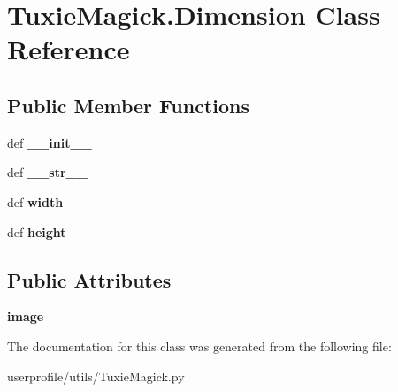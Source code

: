 \hypertarget{classTuxieMagick_1_1Dimension}{\section{Tuxie\-Magick.\-Dimension Class Reference}
\label{classTuxieMagick_1_1Dimension}
}
\subsection*{Public Member Functions}
\begin{DoxyCompactItemize}
\item 
\hypertarget{classTuxieMagick_1_1Dimension_a4182e50319d8e052bd9e65307ad49011}{def {\bfseries \-\_\-\-\_\-init\-\_\-\-\_\-}}\label{classTuxieMagick_1_1Dimension_a4182e50319d8e052bd9e65307ad49011}

\item 
\hypertarget{classTuxieMagick_1_1Dimension_a9420babb8c38d0ae296ee82e5814d11b}{def {\bfseries \-\_\-\-\_\-str\-\_\-\-\_\-}}\label{classTuxieMagick_1_1Dimension_a9420babb8c38d0ae296ee82e5814d11b}

\item 
\hypertarget{classTuxieMagick_1_1Dimension_aa859a20b3d080046b0214c0db05e51d7}{def {\bfseries width}}\label{classTuxieMagick_1_1Dimension_aa859a20b3d080046b0214c0db05e51d7}

\item 
\hypertarget{classTuxieMagick_1_1Dimension_a21750cf5e3332b4b6135fc70623943d4}{def {\bfseries height}}\label{classTuxieMagick_1_1Dimension_a21750cf5e3332b4b6135fc70623943d4}

\end{DoxyCompactItemize}
\subsection*{Public Attributes}
\begin{DoxyCompactItemize}
\item 
\hypertarget{classTuxieMagick_1_1Dimension_ae06417166deb7dd9abd5a6a7ce3f928c}{{\bfseries image}}\label{classTuxieMagick_1_1Dimension_ae06417166deb7dd9abd5a6a7ce3f928c}

\end{DoxyCompactItemize}


The documentation for this class was generated from the following file\-:\begin{DoxyCompactItemize}
\item 
userprofile/utils/Tuxie\-Magick.\-py\end{DoxyCompactItemize}
